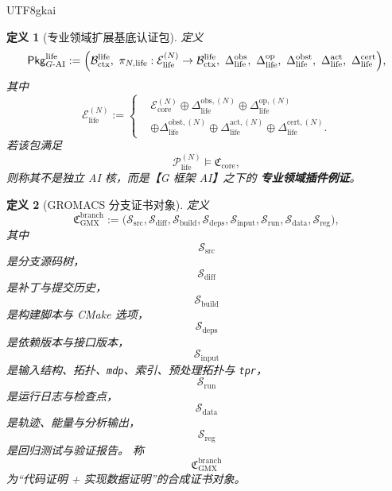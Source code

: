 \documentclass[12pt]{article}
\newtheorem{definition}{定义}[section]
\begin{document}
\begin{CJK*}{UTF8}{gkai}
\begin{definition}[专业领域扩展基底认证包]
\label{def:tex39-ch3-life-pkg}
定义
\[
  \mathsf{Pkg}_{G\text{-AI}}^{\mathrm{life}}
  :=
  \Bigl(
    \mathcal B_{\mathrm{ctx}}^{\mathrm{life}},
    \ \pi_{N,\mathrm{life}}:
    \mathcal E_{\mathrm{life}}^{(N)}
    \to
    \mathcal B_{\mathrm{ctx}}^{\mathrm{life}},
    \ \Delta_{\mathrm{life}}^{\mathrm{obs}},
    \ \Delta_{\mathrm{life}}^{\mathrm{op}},
    \ \Delta_{\mathrm{life}}^{\mathrm{obst}},
    \ \Delta_{\mathrm{life}}^{\mathrm{act}},
    \ \Delta_{\mathrm{life}}^{\mathrm{cert}}
  \Bigr),
\]
其中
\[
  \mathcal E_{\mathrm{life}}^{(N)}
  :=
  \left\{
  \begin{aligned}
    &\mathcal E_{\mathrm{core}}^{(N)}
    \oplus
    \Delta_{\mathrm{life}}^{\mathrm{obs},(N)}
    \oplus
    \Delta_{\mathrm{life}}^{\mathrm{op},(N)}\\
    &\oplus
    \Delta_{\mathrm{life}}^{\mathrm{obst},(N)}
    \oplus
    \Delta_{\mathrm{life}}^{\mathrm{act},(N)}
    \oplus
    \Delta_{\mathrm{life}}^{\mathrm{cert},(N)}.
  \end{aligned}
  \right.
\]
若该包满足
\[
  \mathcal P_{\mathrm{life}}^{(N)}\models \mathfrak C_{\mathrm{core}},
\]
则称其不是独立 AI 核，而是【G 框架 AI】之下的
\textbf{专业领域插件例证}。
\end{definition}

\begin{definition}[GROMACS 分支证书对象]
\label{def:tex39-ch3-gmx-cert}
定义
\[
  \mathfrak C_{\mathrm{GMX}}^{\mathrm{branch}}
  :=
  \bigl(
    \mathcal S_{\mathrm{src}},
    \mathcal S_{\mathrm{diff}},
    \mathcal S_{\mathrm{build}},
    \mathcal S_{\mathrm{deps}},
    \mathcal S_{\mathrm{input}},
    \mathcal S_{\mathrm{run}},
    \mathcal S_{\mathrm{data}},
    \mathcal S_{\mathrm{reg}}
  \bigr),
\]
其中
\[
  \mathcal S_{\mathrm{src}}
\]
是分支源码树，
\[
  \mathcal S_{\mathrm{diff}}
\]
是补丁与提交历史，
\[
  \mathcal S_{\mathrm{build}}
\]
是构建脚本与 CMake 选项，
\[
  \mathcal S_{\mathrm{deps}}
\]
是依赖版本与接口版本，
\[
  \mathcal S_{\mathrm{input}}
\]
是输入结构、拓扑、\texttt{mdp}、索引、预处理拓扑与 \texttt{tpr}，
\[
  \mathcal S_{\mathrm{run}}
\]
是运行日志与检查点，
\[
  \mathcal S_{\mathrm{data}}
\]
是轨迹、能量与分析输出，
\[
  \mathcal S_{\mathrm{reg}}
\]
是回归测试与验证报告。
称
\[
  \mathfrak C_{\mathrm{GMX}}^{\mathrm{branch}}
\]
为“代码证明 + 实现数据证明”的合成证书对象。
\end{definition}


\end{CJK*}
\end{document}
